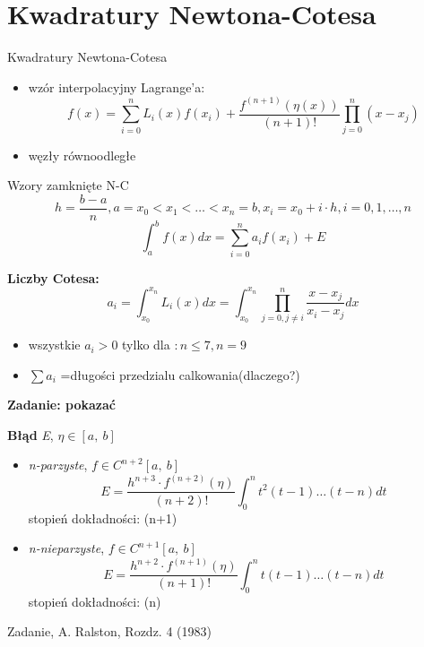 \section{Kwadratury Newtona-Cotesa}
	\begin{frame}{Kwadratury Newtona-Cotesa}
	
    	\begin{itemize}
    	\item wzór interpolacyjny Lagrange'a:
        \[
        f(x)=\sum_{i=0}^{n}L_{i}(x)f(x_{i})+\frac{f^{(n+1)}(\eta(x))}{(n+1)!}\prod_{j=0}^{n}(x-x_{j})
        \]
        \item węzły równoodległe
    	\end{itemize}
	\end{frame}
	\begin{frame}{Wzory zamknięte N-C}
    	$$
        h=\frac{b-a}{n}, a=x_{0}<x_{1}<\ldots<x_{n}=b, x_{i}=x_{0}+i\cdot h, i=0, 1, \ldots , n
        $$
          $$
\int_{a}^{b}f(x)dx=\sum_{i=0}^{n}a_{i}f(x_{i})+E
          $$
		
        \textbf{Liczby Cotesa:}
          $$
a_{i}=\int_{x_{0}}^{x_{n}}L_{i}(x)dx=\int_{x_{0}}^{x_{n}}\prod_{j=0,j\neq i}^{n}\frac{x-x_{j}}{x_{i}-x_{j}}dx
          $$
          \begin{itemize}
          \item wszystkie $a_{i}>0$ tylko dla $:n\leq 7, n=9$
          \item $\sum a_{i}$ =długości przedzialu calkowania(dlaczego?)
          \end{itemize}
         \begin{flushright}
         	\textbf{Zadanie: pokazać}
         \end{flushright}
    
	\end{frame}
	\begin{frame}
    	\textbf{Błąd} \textit{E}, $\eta\in[a,\ b]$ \newline
        \begin{itemize}
        \item \textit{n-parzyste}, $f\in C^{n+2}[a,\ b]$
        $$
 		E= \frac{h^{n+3}\cdot f^{(n+2)}(\eta)}{(n+2)!}\int_{0}^{n}t^{2}(t-1)\ldots(t-n)dt
 		$$
        stopień dokładności: (n+1) 
        \item \textit{n-nieparzyste}, $f\in C^{n+1}[a,\ b]$
        $$
		E=\frac{h^{n+2}\cdot f^{(n+1)}(\eta)}{(n+1)!}\int_{0}^{n}t(t-1)\ldots(t-n)dt
 		$$
        stopień dokładności: (n)
        \end{itemize}
        \begin{flushright}
         	Zadanie, A. Ralston, Rozdz. 4 (1983)
        \end{flushright}
	\end{frame}
